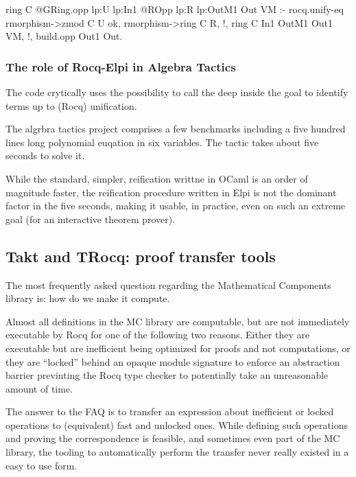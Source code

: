 \documentclass[a4paper, 11pt]{book}
\begin{document}
\begin{elpicode}
ring C {{ @GRing.opp lp:U lp:In1 }} {{ @ROpp lp:R lp:OutM1 }} Out VM :-
  rocq.unify-eq { rmorphism->zmod C } U ok,
  rmorphism->ring C R, !,
  ring C In1 OutM1 Out1 VM, !,
  build.opp Out1 Out.  
\end{elpicode}

\subsubsection{The role of Rocq-Elpi in Algebra Tactics}

The code crytically uses the possibility to call
the  deep inside the goal to identify
terms up to (Rocq) unification.

The algrbra tactics project comprises a few benchmarks including
a five hundred lines long polynomial euqation in six variables.
The  tactic takes about five seconds to solve it.

While the standard, simpler, reification writtne in OCaml is an order of
magnitude faster, the reification procedure written in Elpi is not the dominant
factor in the five seconds, making it usable, in practice, even on such an
extreme goal (for an interactive theorem prover).


\subsection{Takt and TRocq: proof transfer tools}

The most frequently asked question regarding the Mathematical Components
library is: how do we make it compute.

Almost all definitions in the MC library
are computable, but are not immediately executable by Rocq for one of
the following two reasons. Either they are executable but are inefficient
being optimized for proofs and not computations, or they are ``locked''
behind an opaque module signature to enforce an abstraction barrier previnting
the Rocq type checker to potentially take an unreasonable amount of time.

The answer to the FAQ is to transfer an expression about inefficient or
locked operations to (equivalent) fast and unlocked ones. While defining
such operations and proving the correspondence is feasible, and sometimes
even part of the MC library, the tooling to automatically perform
the transfer never really existed in a easy to use form.
\end{document}

